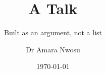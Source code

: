 \documentclass[aspectratio=169,11pt]{beamer}
\title{A Talk}
\subtitle{Built as an argument, not a list}
\author{Dr Amara Nwosu}
\date{\today}
\begin{document}
\titleslide





\end{document}

